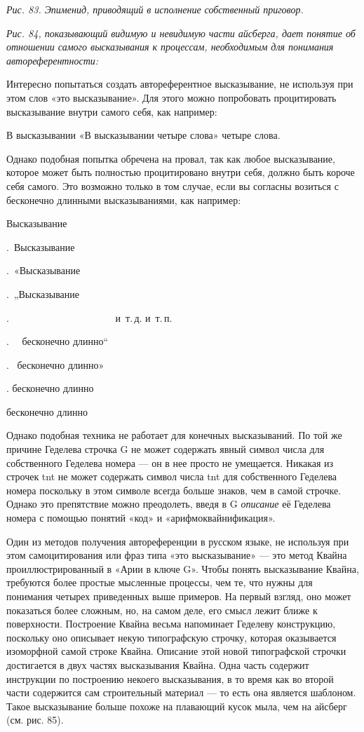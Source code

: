 \documentclass[../main.tex]{subfiles}
\begin{document}
\emph{Рис. 83. Эпименид, приводящий в исполнение собственный приговор.}

\emph{Рис. 84, показывающий видимую и невидимую части айсберга, дает понятие об отношении самого высказывания к процессам, необходимым для понимания автореферентности:}

Интересно попытаться создать автореферентное высказывание, не используя при этом слов «это высказывание». Для этого можно попробовать процитировать высказывание внутри самого себя, как например:

В высказывании «В высказывании четыре слова» четыре слова.

Однако подобная попытка обречена на провал, так как любое высказывание, которое может быть полностью процитировано внутри себя, должно быть короче себя самого. Это возможно только в том случае, если вы согласны возиться с бесконечно длинными высказываниями, как например:

Высказывание

.~Высказывание

.~«Высказывание

.~„Высказывание

.~~~~~~~~~~~~~~~~~~~~~ и~т.\,д. и~т.\,п.

.~~ бесконечно длинно``

.~ бесконечно длинно»

. бесконечно длинно

бесконечно длинно

Однако подобная техника не работает для конечных высказываний. По той же причине Геделева строчка G не может содержать явный символ числа для собственного Геделева номера --- он в нее просто не умещается. Никакая из строчек \acs{tnt} не может содержать символ числа \acs{tnt} для собственного Геделева номера поскольку в этом символе всегда больше знаков, чем в самой строчке. Однако это препятствие можно преодолеть, введя в G \emph{описание} её Геделева номера с помощью понятий «код» и «арифмоквайнификация».

Один из методов получения автореференции в русском языке, не используя при этом самоцитирования или фраз типа «это высказывание» --- это метод Квайна проиллюстрированный в «Арии в ключе G». Чтобы понять высказывание Квайна, требуются более простые мысленные процессы, чем те, что нужны для понимания четырех приведенных выше примеров. На первый взгляд, оно может показаться более сложным, но, на самом деле, его смысл лежит ближе к поверхности. Построение Квайна весьма напоминает Геделеву конструкцию, поскольку оно описывает некую типографскую строчку, которая оказывается изоморфной самой строке Квайна. Описание этой новой типографской строчки достигается в двух частях высказывания Квайна. Одна часть содержит инструкции по построению некоего высказывания, в то время как во второй части содержится сам строительный материал --- то есть она является шаблоном. Такое высказывание больше похоже на плавающий кусок мыла, чем на айсберг (см. рис. 85).
\end{document}
